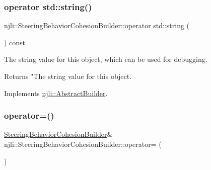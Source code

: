 \subsubsection{\texorpdfstring{operator std\+::string()}{operator std::string()}}
{\footnotesize\ttfamily njli\+::\+Steering\+Behavior\+Cohesion\+Builder\+::operator std\+::string (\begin{DoxyParamCaption}{ }\end{DoxyParamCaption}) const\hspace{0.3cm}{\ttfamily [virtual]}}

The string value for this object, which can be used for debugging.

\begin{DoxyReturn}{Returns}
"The string value for this object. 
\end{DoxyReturn}


Implements \mbox{\hyperlink{classnjli_1_1_abstract_builder_a3e6e553e06d1ca30517ad5fb0bd4d000}{njli\+::\+Abstract\+Builder}}.

\mbox{\label{classnjli_1_1_steering_behavior_cohesion_builder_a4232e2d9cd367c5ab1920945e82a265f}} 
\subsubsection{\texorpdfstring{operator=()}{operator=()}}
{\footnotesize\ttfamily \mbox{\hyperlink{classnjli_1_1_steering_behavior_cohesion_builder}{Steering\+Behavior\+Cohesion\+Builder}}\& njli\+::\+Steering\+Behavior\+Cohesion\+Builder\+::operator= (\begin{DoxyParamCaption}\item[{const \mbox{\hyperlink{classnjli_1_1_steering_behavior_cohesion_builder}{Steering\+Behavior\+Cohesion\+Builder}} \&}]{ }\end{DoxyParamCaption})\hspace{0.3cm}{\ttfamily [protected]}}

\mbox{\label{classnjli_1_1_steering_behavior_cohesion_builder_aa2682c7df3d8e451aeed4d52199ee540}} 
